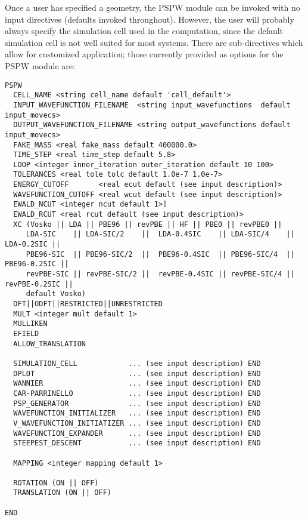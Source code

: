 Once a user has specified a geometry, the PSPW module can be invoked
with no input  directives (defaults invoked throughout).  However, the
user will probably always specify the  simulation cell used in the
computation, since the default simulation cell is not well suited for
most systems.  There are sub-directives which allow for customized
application; those currently provided as options for the PSPW module are:
\begin{verbatim}
PSPW
  CELL_NAME <string cell_name default 'cell_default'>
  INPUT_WAVEFUNCTION_FILENAME  <string input_wavefunctions  default input_movecs>
  OUTPUT_WAVEFUNCTION_FILENAME <string output_wavefunctions default input_movecs>
  FAKE_MASS <real fake_mass default 400000.0>
  TIME_STEP <real time_step default 5.8>
  LOOP <integer inner_iteration outer_iteration default 10 100>
  TOLERANCES <real tole tolc default 1.0e-7 1.0e-7>
  ENERGY_CUTOFF       <real ecut default (see input description)>
  WAVEFUNCTION_CUTOFF <real wcut default (see input description)>
  EWALD_NCUT <integer ncut default 1>]
  EWALD_RCUT <real rcut default (see input description)>
  XC (Vosko || LDA || PBE96 || revPBE || HF || PBE0 || revPBE0 || 
     LDA-SIC    || LDA-SIC/2    ||  LDA-0.4SIC    || LDA-SIC/4    || LDA-0.2SIC ||
     PBE96-SIC  || PBE96-SIC/2  ||  PBE96-0.4SIC  || PBE96-SIC/4  || PBE96-0.2SIC ||
     revPBE-SIC || revPBE-SIC/2 ||  revPBE-0.4SIC || revPBE-SIC/4 || revPBE-0.2SIC ||
     default Vosko)
  DFT||ODFT||RESTRICTED||UNRESTRICTED
  MULT <integer mult default 1>
  MULLIKEN
  EFIELD
  ALLOW_TRANSLATION

  SIMULATION_CELL            ... (see input description) END
  DPLOT                      ... (see input description) END
  WANNIER                    ... (see input description) END
  CAR-PARRINELLO             ... (see input description) END
  PSP_GENERATOR              ... (see input description) END
  WAVEFUNCTION_INITIALIZER   ... (see input description) END
  V_WAVEFUNCTION_INITIATIZER ... (see input description) END
  WAVEFUNCTION_EXPANDER      ... (see input description) END
  STEEPEST_DESCENT           ... (see input description) END

  MAPPING <integer mapping default 1>

  ROTATION (ON || OFF)
  TRANSLATION (ON || OFF)

END 
\end{verbatim}


